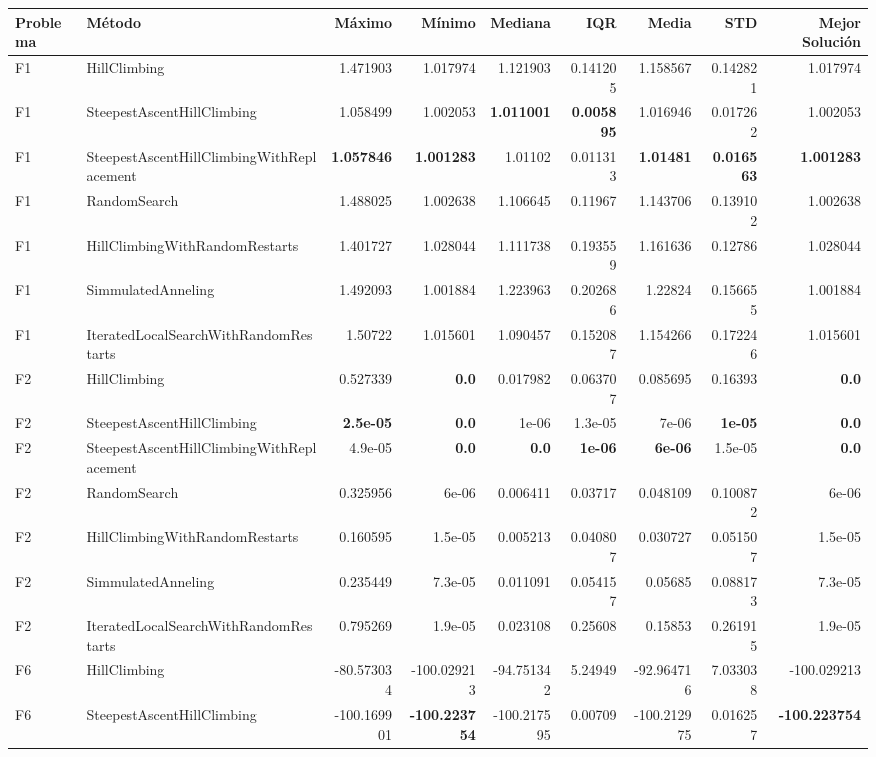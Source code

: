 \begin{tabular}{llrrrrrrr}
\toprule
Problema & Método & Máximo & Mínimo & Mediana & IQR & Media & STD & Mejor Solución \\ 
\midrule
F1 & HillClimbing & 1.471903 & 1.017974 & 1.121903 & 0.141205 & 1.158567 & 0.142821 & 1.017974 \\ 
F1 & SteepestAscentHillClimbing & 1.058499 & 1.002053 & \textbf{1.011001} & \textbf{0.005895} & 1.016946 & 0.017262 & 1.002053 \\ 
F1 & SteepestAscentHillClimbingWithReplacement & \textbf{1.057846} & \textbf{1.001283} & 1.01102 & 0.011313 & \textbf{1.01481} & \textbf{0.016563} & \textbf{1.001283} \\ 
F1 & RandomSearch & 1.488025 & 1.002638 & 1.106645 & 0.11967 & 1.143706 & 0.139102 & 1.002638 \\ 
F1 & HillClimbingWithRandomRestarts & 1.401727 & 1.028044 & 1.111738 & 0.193559 & 1.161636 & 0.12786 & 1.028044 \\ 
F1 & SimmulatedAnneling & 1.492093 & 1.001884 & 1.223963 & 0.202686 & 1.22824 & 0.156655 & 1.001884 \\ 
F1 & IteratedLocalSearchWithRandomRestarts & 1.50722 & 1.015601 & 1.090457 & 0.152087 & 1.154266 & 0.172246 & 1.015601 \\ 
F2 & HillClimbing & 0.527339 & \textbf{0.0} & 0.017982 & 0.063707 & 0.085695 & 0.16393 & \textbf{0.0} \\ 
F2 & SteepestAscentHillClimbing & \textbf{2.5e-05} & \textbf{0.0} & 1e-06 & 1.3e-05 & 7e-06 & \textbf{1e-05} & \textbf{0.0} \\ 
F2 & SteepestAscentHillClimbingWithReplacement & 4.9e-05 & \textbf{0.0} & \textbf{0.0} & \textbf{1e-06} & \textbf{6e-06} & 1.5e-05 & \textbf{0.0} \\ 
F2 & RandomSearch & 0.325956 & 6e-06 & 0.006411 & 0.03717 & 0.048109 & 0.100872 & 6e-06 \\ 
F2 & HillClimbingWithRandomRestarts & 0.160595 & 1.5e-05 & 0.005213 & 0.040807 & 0.030727 & 0.051507 & 1.5e-05 \\ 
F2 & SimmulatedAnneling & 0.235449 & 7.3e-05 & 0.011091 & 0.054157 & 0.05685 & 0.088173 & 7.3e-05 \\ 
F2 & IteratedLocalSearchWithRandomRestarts & 0.795269 & 1.9e-05 & 0.023108 & 0.25608 & 0.15853 & 0.261915 & 1.9e-05 \\ 
F6 & HillClimbing & -80.573034 & -100.029213 & -94.751342 & 5.24949 & -92.964716 & 7.033038 & -100.029213 \\ 
F6 & SteepestAscentHillClimbing & -100.169901 & \textbf{-100.223754} & -100.217595 & 0.00709 & -100.212975 & 0.016257 & \textbf{-100.223754} \\ 

\end{tabular}
